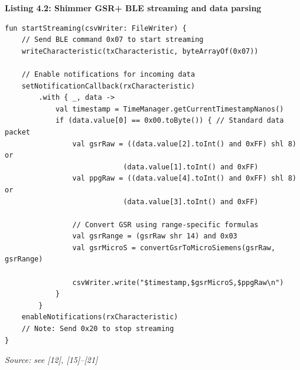\documentclass[12pt,a4paper]{article}
\begin{document}
\textbf{Listing 4.2: Shimmer GSR+ BLE streaming and data parsing}

\begin{lstlisting}
fun startStreaming(csvWriter: FileWriter) {
    // Send BLE command 0x07 to start streaming
    writeCharacteristic(txCharacteristic, byteArrayOf(0x07))
    
    // Enable notifications for incoming data
    setNotificationCallback(rxCharacteristic)
        .with { _, data ->
            val timestamp = TimeManager.getCurrentTimestampNanos()
            if (data.value[0] == 0x00.toByte()) { // Standard data packet
                val gsrRaw = ((data.value[2].toInt() and 0xFF) shl 8) or 
                            (data.value[1].toInt() and 0xFF)
                val ppgRaw = ((data.value[4].toInt() and 0xFF) shl 8) or 
                            (data.value[3].toInt() and 0xFF)
                
                // Convert GSR using range-specific formulas
                val gsrRange = (gsrRaw shr 14) and 0x03
                val gsrMicroS = convertGsrToMicroSiemens(gsrRaw, gsrRange)
                
                csvWriter.write("$timestamp,$gsrMicroS,$ppgRaw\n")
            }
        }
    enableNotifications(rxCharacteristic)
    // Note: Send 0x20 to stop streaming
}
\end{lstlisting}

\emph{Source: see {[}12{]}, {[}15{]}--{[}21{]}}
\end{document}
